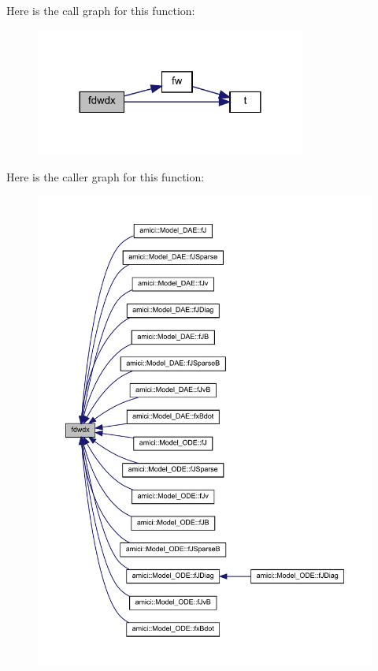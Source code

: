 Here is the call graph for this function\+:
\nopagebreak
\begin{figure}[H]
\begin{center}
\leavevmode
\includegraphics[width=252pt]{classamici_1_1_model_abb03525327d4536166bc1e072fe34530_cgraph}
\end{center}
\end{figure}
Here is the caller graph for this function\+:
\nopagebreak
\begin{figure}[H]
\begin{center}
\leavevmode
\includegraphics[width=350pt]{classamici_1_1_model_abb03525327d4536166bc1e072fe34530_icgraph}
\end{center}
\end{figure}
\mbox{\label{classamici_1_1_model_a991a9aab9f325625a35179fa601fa426}} 
